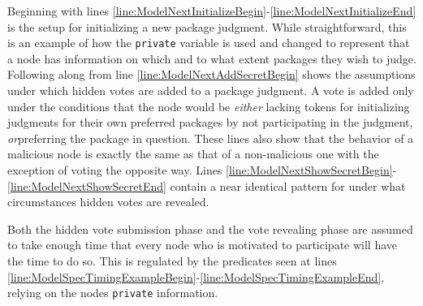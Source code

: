 Beginning with lines \ref{line:ModelNextInitializeBegin}-\ref{line:ModelNextInitializeEnd} is the setup for initializing a new package judgment. While straightforward, this is an example of how the \texttt{private} variable is used and changed to represent that a node has information on which and to what extent packages they wish to judge. Following along from line \ref{line:ModelNextAddSecretBegin} shows the assumptions under which hidden votes are added to a package judgment. A vote is added only under the conditions that the node would be \emph{either} lacking tokens for initializing judgments for their own preferred packages by not participating in the judgment, \emph{or}preferring the package in question. These lines also show that the behavior of a malicious node is exactly the same as that of a non-malicious one with the exception of voting the opposite way. Lines \ref{line:ModelNextShowSecretBegin}-\ref{line:ModelNextShowSecretEnd} contain a near identical pattern for under what circumstances hidden votes are revealed.

Both the hidden vote submission phase and the vote revealing phase are assumed to take enough time that every node who is motivated to participate will have the time to do so. This is regulated by the predicates seen at lines \ref{line:ModelSpecTimingExampleBegin}-\ref{line:ModelSpecTimingExampleEnd}, relying on the nodes \texttt{private} information.